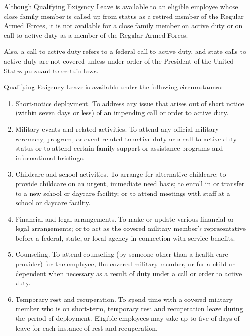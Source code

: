 \documentclass{book}
\begin{document}
Although Qualifying Exigency Leave is available to an eligible employee whose close family member is called up from status as a retired member of the Regular Armed Forces, it is not available for a close family member on active duty or on call to active duty as a member of the Regular Armed Forces.

Also, a call to active duty refers to a federal call to active duty, and state calls to active duty are not covered unless under order of the President of the United States pursuant to certain laws.

Qualifying Exigency Leave is available under the following circumstances:

\begin{enumerate} \item Short-notice deployment. To address any issue that arises out of short notice (within seven days or less) of an impending call or order to active duty.

\item Military events and related activities. To attend any official military ceremony, program, or event related to active duty or a call to active duty status or to attend certain family support or assistance programs and informational briefings.

\item Childcare and school activities. To arrange for alternative childcare; to provide childcare on an urgent, immediate need basis; to enroll in or transfer to a new school or daycare facility; or to attend meetings with staff at a school or daycare facility.

\item Financial and legal arrangements. To make or update various financial or legal arrangements; or to act as the covered military member's representative before a federal, state, or local agency in connection with service benefits.

\item Counseling. To attend counseling (by someone other than a health care provider) for the employee, the covered military member, or for a child or dependent when necessary as a result of duty under a call or order to active duty.

\item Temporary rest and recuperation. To spend time with a covered military member who is on short-term, temporary rest and recuperation leave during the period of deployment. Eligible employees may take up to five of days of leave for each instance of rest and recuperation.


\end{enumerate}
\end{document}

